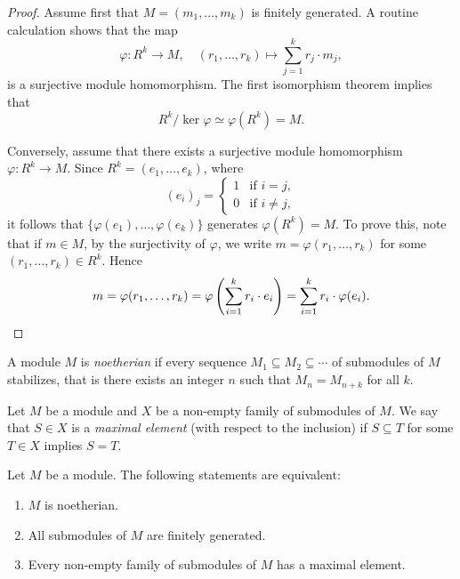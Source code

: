 \begin{proof}
    Assume first that $M=(m_1,\dots,m_k)$ is finitely generated. A routine calculation shows that
    the map
    \[
    \varphi\colon R^k\to M,\quad
    (r_1,\dots,r_k)\mapsto \sum_{j=1}^kr_j\cdot m_j,
    \]
    is a surjective module homomorphism. The first isomorphism theorem implies that 
    \[ 
    R^k/\ker\varphi\simeq\varphi(R^k)=M.
    \]
    
    Conversely, assume that there exists a 
    surjective module homomorphism $\varphi\colon R^k\to M$. Since 
    $R^k=(e_1,\dots,e_k)$, where 
    \[
    (e_i)_j=\begin{cases}
    1 & \text{if $i=j$},\\
    0 & \text{if $i\ne j$},
    \end{cases}
    \]
    it follows that $\{\varphi(e_1),\dots,\varphi(e_k)\}$ generates $\varphi(R^k)=M$. To prove this, note that  
    if $m\in M$, by the surjectivity of $\varphi$, we write $m=\varphi(r_1,\dots,r_k)$ for some $(r_1,\dots,r_k)\in R^k$. 
    Hence  
    \[
    m=\varphi(r_1,\dots,r_k)=\varphi\left(\sum_{i=1}^k r_i\cdot e_i\right)
    =\sum_{i=1}^kr_i\cdot\varphi(e_i).\qedhere
    \]
\end{proof}

\begin{definition}
    A module $M$ is \emph{noetherian} if every sequence $M_1\subseteq M_2\subseteq\cdots$ of submodules of $M$ 
    stabilizes, that is there exists an integer $n$ such that $M_n=M_{n+k}$ for all $k$. 	
\end{definition}

Let $M$ be a module and $X$ be a non-empty 
family of submodules of $M$. We say that $S\in X$ is a \emph{maximal 
element} (with respect to the inclusion) if $S\subseteq T$ for some $T\in X$ implies $S=T$. 

\begin{proposition}
Let $M$ be a module. The following statements are equivalent:
\begin{enumerate}
\item $M$ is noetherian.
\item All submodules of $M$ are finitely generated.
\item Every non-empty family of submodules of $M$ has a maximal element. 	
\end{enumerate}
\end{proposition}

